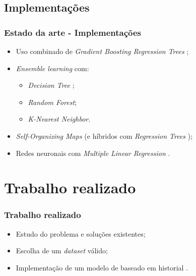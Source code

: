 \documentclass{beamer}
\begin{document}
\subsection[Implementacoes]{Implementações}
\begin{frame}[label={Implementacoes}]
\frametitle{Estado da arte - Implementações}

\let\oldfootnotesize\footnotesize
\renewcommand*{\footnotesize}{\oldfootnotesize\tiny}

\begin{itemize}
	\item Uso combinado de \textit{Gradient Boosting Regression Trees}
		  ;
	\item \textit{Ensemble learning}  com: 
		  \begin{itemize}
			  \item \textit{Decision Tree };
			  \item \textit{Random Forest};
			  \item \textit{K-Nearest Neighbor}.
		  \end{itemize}
	\item \textit{Self-Organizing Maps} 
		  (e híbridos com \textit{Regression Trees} );
	\item Redes neuronais com \textit{Multiple Linear Regression} 
		  .
\end{itemize}

\renewcommand*{\footnotesize}{\oldfootnotesize}

\end{frame}

\section[Trabalho realizado]{Trabalho realizado}
\begin{frame}
\frametitle{Trabalho realizado}

\begin{itemize}
	\item Estudo do problema e soluções existentes;
	\item Escolha de um \textit{dataset} válido;
	\item Implementação de um modelo de baseado em historial .
\end{itemize}

\end{frame}
\end{document}
